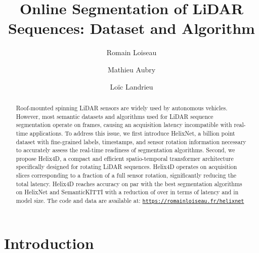 \documentclass[runningheads]{tpls/llncs}
\begin{document}
\pagestyle{headings}
\mainmatter

\title{Online Segmentation of LiDAR Sequences: Dataset and Algorithm} 


\author{Romain Loiseau
\and
Mathieu Aubry
\and
Loïc Landrieu
}


\maketitle

\begin{abstract}
Roof-mounted spinning LiDAR sensors are widely used by autonomous vehicles. However, most semantic datasets and algorithms used for LiDAR sequence segmentation operate on  frames, causing an acquisition latency incompatible with real-time applications. To address this issue, we first introduce HelixNet, a  billion point dataset with fine-grained labels, timestamps, and sensor rotation information necessary to accurately assess the real-time readiness of segmentation algorithms. Second, we propose Helix4D, a compact and efficient spatio-temporal transformer architecture specifically designed for rotating LiDAR sequences. Helix4D operates on acquisition slices corresponding to a fraction of a full sensor rotation, significantly reducing the total latency. Helix4D reaches accuracy on par with the best segmentation algorithms on HelixNet and SemanticKITTI with a reduction of over  in terms of latency and  in model size. The code and data are available at: {\tt{\url{https://romainloiseau.fr/helixnet}}} 
\end{abstract}

\captionsetup[table]{font=small}
\captionsetup[figure]{font=small}
\captionsetup[subfigure]{font=small}

\section{Introduction}\label{sec:introduction}
\end{document}
